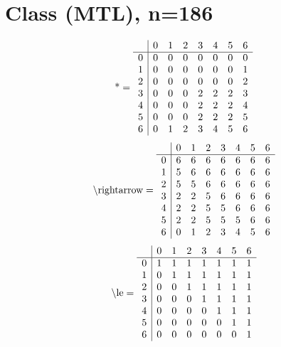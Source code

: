 \documentclass[11pt]{article}
\begin{document}
\section{Class (MTL), n=186}
\[\text{*} = 
\begin{array}{r | r r r r r r r}
 & 0 & 1 & 2 & 3 & 4 & 5 & 6 \\ \hline
0 & 0 & 0 & 0 & 0 & 0 & 0 & 0 \\
1 & 0 & 0 & 0 & 0 & 0 & 0 & 1 \\
2 & 0 & 0 & 0 & 0 & 0 & 0 & 2 \\
3 & 0 & 0 & 0 & 2 & 2 & 2 & 3 \\
4 & 0 & 0 & 0 & 2 & 2 & 2 & 4 \\
5 & 0 & 0 & 0 & 2 & 2 & 2 & 5 \\
6 & 0 & 1 & 2 & 3 & 4 & 5 & 6 \\
\end{array}
\]
\[\text{\textbackslash rightarrow} = 
\begin{array}{r | r r r r r r r}
 & 0 & 1 & 2 & 3 & 4 & 5 & 6 \\ \hline
0 & 6 & 6 & 6 & 6 & 6 & 6 & 6 \\
1 & 5 & 6 & 6 & 6 & 6 & 6 & 6 \\
2 & 5 & 5 & 6 & 6 & 6 & 6 & 6 \\
3 & 2 & 2 & 5 & 6 & 6 & 6 & 6 \\
4 & 2 & 2 & 5 & 5 & 6 & 6 & 6 \\
5 & 2 & 2 & 5 & 5 & 5 & 6 & 6 \\
6 & 0 & 1 & 2 & 3 & 4 & 5 & 6 \\
\end{array}
\]
\[\text{\textbackslash le} = 
\begin{array}{r | r r r r r r r}
 & 0 & 1 & 2 & 3 & 4 & 5 & 6 \\ \hline
0 & 1 & 1 & 1 & 1 & 1 & 1 & 1 \\
1 & 0 & 1 & 1 & 1 & 1 & 1 & 1 \\
2 & 0 & 0 & 1 & 1 & 1 & 1 & 1 \\
3 & 0 & 0 & 0 & 1 & 1 & 1 & 1 \\
4 & 0 & 0 & 0 & 0 & 1 & 1 & 1 \\
5 & 0 & 0 & 0 & 0 & 0 & 1 & 1 \\
6 & 0 & 0 & 0 & 0 & 0 & 0 & 1 \\
\end{array}
\]
\end{document}
